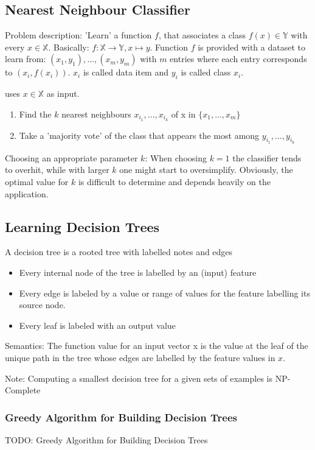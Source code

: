 \subsection{Nearest Neighbour Classifier}
Problem description: 'Learn' a function $f$, that associates a class $f(x) \in \mathbb{Y}$ with every $x \in \mathbb{X}$. Basically: $f: \mathbb{X} \rightarrow \mathbb{Y},x \mapsto y$. Function $f$ is provided with a dataset to learn from: $(x_1,y_1), \ldots, (x_m,y_m)$ with $m$ entries where each entry corresponds to $(x_i,f(x_i))$. $x_i$ is called data item and $y_i$ is called class $x_i$.

 uses $x \in \mathbb{X}$ as input.
\begin{enumerate}
	\item Find the $k$ nearest neighbours $x_{i_1},\ldots,x_{i_k}$ of x in $\{x_1,\ldots,x_m\}$
	\item Take a 'majority vote' of the class that appears the most among $y_{i_1},\ldots,y_{i_k}$
\end{enumerate}

Choosing an appropriate parameter $k$: When choosing $k=1$ the classifier tends to overhit, while with larger $k$ one might start to oversimplify. Obviously, the optimal value for $k$ is difficult to determine and depends heavily on the application.

\subsection{Learning Decision Trees}
A decision tree is a rooted tree with labelled notes and edges
\begin{itemize}
	\item Every internal node of the tree is labelled by an (input) feature
	\item Every edge is labeled by a value or range of values for the feature labelling its source node.
	\item Every leaf is labeled with an output value
\end{itemize}
Semantics: The function value for an input vector x is the value at the leaf of the unique path in the tree whose edges are labelled by the feature values in $x$.

Note: Computing a smallest decision tree for a given sets of examples is NP-Complete
\subsubsection{Greedy Algorithm for Building Decision Trees}
TODO: Greedy Algorithm for Building Decision Trees

